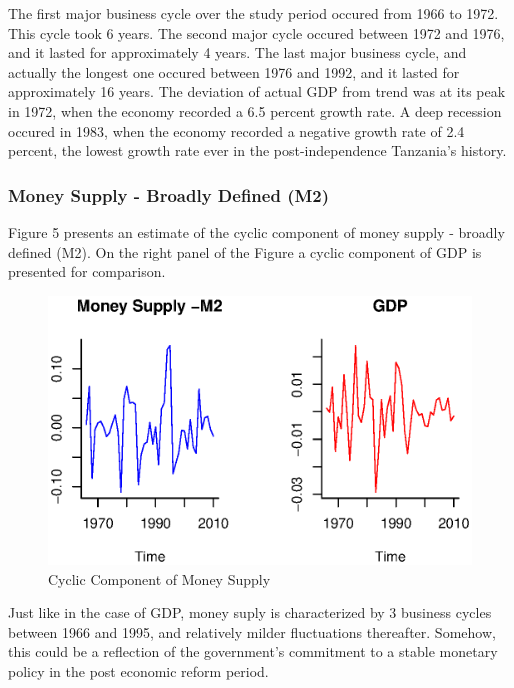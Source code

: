 \documentclass[12pt,a4paper,final]{article}
\begin{document}
The first major business cycle over the study period occured from 1966 to 1972.  This cycle took 6 years.  The second major cycle occured between 1972 and 1976, and it lasted for approximately 4 years. The last major business cycle, and actually the longest one occured between 1976 and 1992, and it lasted for approximately 16 years. The deviation of actual GDP from trend was at its peak in 1972, when the economy recorded a 6.5 percent growth rate. A deep recession occured in 1983, when the economy recorded a negative growth rate of 2.4 percent, the lowest growth rate ever in the post-independence Tanzania's history.

\subsubsection{Money Supply - Broadly Defined (M2)}

Figure 5 presents an estimate of the cyclic component of money supply - broadly defined (M2). On the right panel of the Figure a cyclic component of GDP is presented for comparison.

\begin{figure}[ht]
\centering
\begin{small}
\caption{Cyclic Component of Money Supply}
\end{small}
\includegraphics[scale=0.601]{money_supply.eps} 
\end{figure}

Just like in the case of GDP, money suply is characterized by 3 business cycles between 1966 and 1995, and relatively milder fluctuations thereafter. Somehow, this could be a reflection of the government's commitment to a stable monetary policy in the post economic reform period. 
\end{document}
